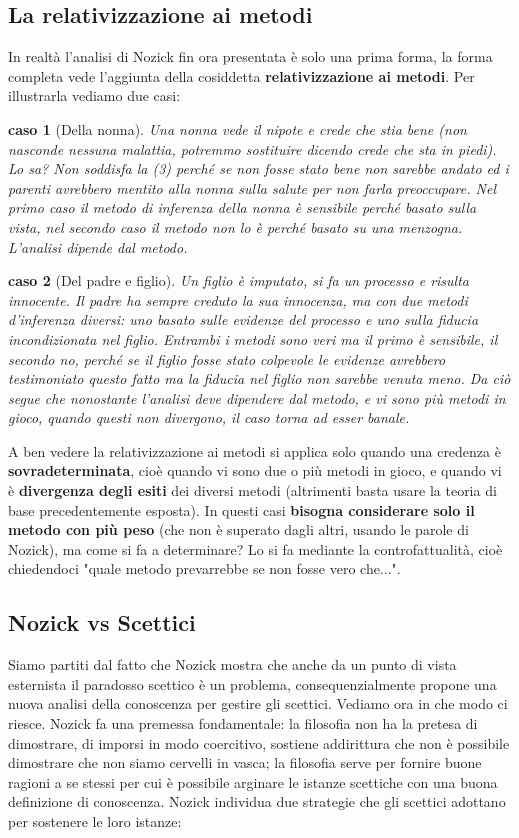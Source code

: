 \documentclass[10pt,a4paper]{article}
\newtheorem{caso}{caso}
\begin{document}
\subsection{La relativizzazione ai metodi}
In realtà l'analisi di Nozick fin ora presentata è solo una prima forma, la forma completa vede l'aggiunta della cosiddetta \textbf{relativizzazione ai metodi}.
Per illustrarla vediamo due casi:
\begin{caso}[Della nonna]
	Una nonna vede il nipote e crede che stia bene (non nasconde nessuna malattia, potremmo sostituire dicendo crede che sta in piedi). Lo sa? Non soddisfa la (3) perché se non fosse stato bene non sarebbe andato ed i parenti avrebbero mentito alla nonna sulla salute per non farla preoccupare. Nel primo caso il metodo di inferenza della nonna è sensibile perché basato sulla vista, nel secondo caso il metodo non lo è perché basato su una menzogna. L'analisi dipende dal metodo.
\end{caso}
\begin{caso}[Del padre e figlio]
	Un figlio è imputato, si fa un processo e risulta innocente. Il padre ha sempre creduto la sua innocenza, ma con due metodi d'inferenza diversi: uno basato sulle evidenze del processo e uno sulla fiducia incondizionata nel figlio. Entrambi i metodi sono veri ma il primo è sensibile, il secondo no, perché se il figlio fosse stato colpevole le evidenze avrebbero testimoniato questo fatto ma la fiducia nel figlio non sarebbe venuta meno. Da ciò segue che nonostante l'analisi deve dipendere dal metodo, e vi sono più metodi in gioco, quando questi non divergono, il caso torna ad esser banale.
\end{caso}
A ben vedere la relativizzazione ai metodi si applica solo quando una credenza è \textbf{sovradeterminata}, cioè quando vi sono due o più metodi in gioco, e quando vi è \textbf{divergenza degli esiti} dei diversi metodi (altrimenti basta usare la teoria di base precedentemente esposta). In questi casi\textbf{ bisogna considerare solo il metodo con più peso} (che non è superato dagli altri, usando le parole di Nozick), ma come si fa a determinare? Lo si fa mediante la controfattualità, cioè chiedendoci "quale metodo prevarrebbe se non fosse vero che...".
\subsection{Nozick vs Scettici}
Siamo partiti dal fatto che Nozick mostra che anche da un punto di vista esternista il paradosso scettico è un problema, consequenzialmente propone una nuova analisi della conoscenza per gestire gli scettici. Vediamo ora in che modo ci riesce. Nozick fa una premessa fondamentale: la filosofia non ha la pretesa di dimostrare, di imporsi in modo coercitivo, sostiene addirittura che non è possibile dimostrare che non siamo cervelli in vasca; la filosofia serve per fornire buone ragioni a se stessi per cui è possibile arginare le istanze scettiche con una buona definizione di conoscenza. Nozick individua due strategie che gli scettici adottano per sostenere le loro istanze:
\end{document}
